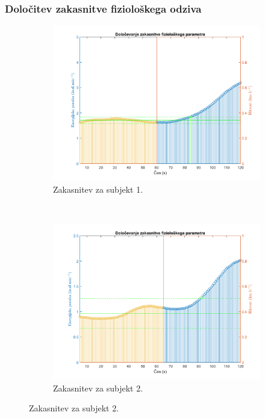 \subsubsection{Določitev zakasnitve fiziološkega odziva}
\begin{figure}[!htbp]
	\centering
	\begin{subfigure}[t]{0.45\columnwidth}
		\includegraphics[width=\columnwidth]{./Slike/lag-estimation-1-eem.png}
		\caption{Zakasnitev za subjekt 1.}
		\label{fig:lag-estimation-1-eem}
	\end{subfigure}
	~
	\begin{subfigure}[t]{0.45\columnwidth}
		\includegraphics[width=\columnwidth]{./Slike/lag-estimation-2-eem.png}
		\caption{Zakasnitev za subjekt 2.}

\end{subfigure}
\end{figure}
